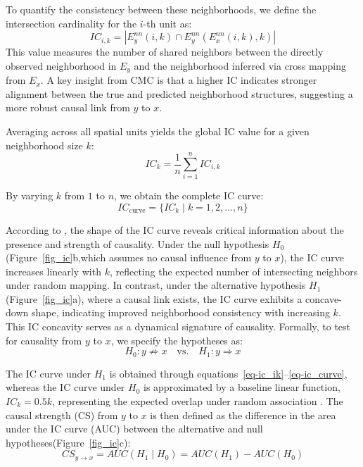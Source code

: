 \documentclass[authoryear,preprint,review,12pt]{elsarticle}
\begin{document}
To quantify the consistency between these neighborhoods, we define the intersection cardinality for the $i$-th unit as:
\begin{equation}\label{eq-ic_ik}
IC_{i,k} = \left| E_y^{nn}(i,k) \cap E_y^{nn}(E_x^{nn}(i,k),k) \right|
\end{equation}
\noindent This value measures the number of shared neighbors between the directly observed neighborhood in $E_y$ and the neighborhood inferred via cross mapping from $E_x$. A key insight from CMC \citep{tao2023cmc} is that a higher IC indicates stronger alignment between the true and predicted neighborhood structures, suggesting a more robust causal link from $y$ to $x$.

Averaging across all spatial units yields the global IC value for a given neighborhood size $k$:
\begin{equation}\label{eq-ic_k}
IC_k = \frac{1}{n} \sum_{i=1}^n IC_{i,k}
\end{equation}

By varying $k$ from $1$ to $n$, we obtain the complete IC curve:
\begin{equation}\label{eq-ic_curve}
IC_{\text{curve}} = \{ IC_k \mid k = 1, 2, \dots, n \}
\end{equation}

According to \cite{tao2023cmc}, the shape of the IC curve reveals critical information about the presence and strength of causality. Under the null hypothesis $H_0$(Figure~\ref{fig_ic}b,which assumes no causal influence from $y$ to $x$), the IC curve increases linearly with $k$, reflecting the expected number of intersecting neighbors under random mapping. In contrast, under the alternative hypothesis $H_1$(Figure~\ref{fig_ic}a), where a causal link exists, the IC curve exhibits a concave-down shape, indicating improved neighborhood consistency with increasing $k$. This IC concavity serves as a dynamical signature of causality. Formally, to test for causality from $y$ to $x$, we specify the hypotheses as:
\begin{equation}\label{eq-hypothesis}
H_0: y \not\Rightarrow x \quad \text{vs.} \quad H_1: y \Rightarrow x
\end{equation}

The IC curve under $H_1$ is obtained through equations~\ref{eq-ic_ik}–\ref{eq-ic_curve}, whereas the IC curve under $H_0$ is approximated by a baseline linear function, $IC_k = 0.5k$, representing the expected overlap under random association \citep{tao2023cmc}. The causal strength (CS) from $y$ to $x$ is then defined as the difference in the area under the IC curve (AUC) between the alternative and null hypotheses(Figure~\ref{fig_ic}c):
\begin{equation}\label{eq-cs}
CS_{y \rightarrow x} = AUC(H_1 \mid H_0) = AUC(H_1) - AUC(H_0)
\end{equation}
\end{document}
